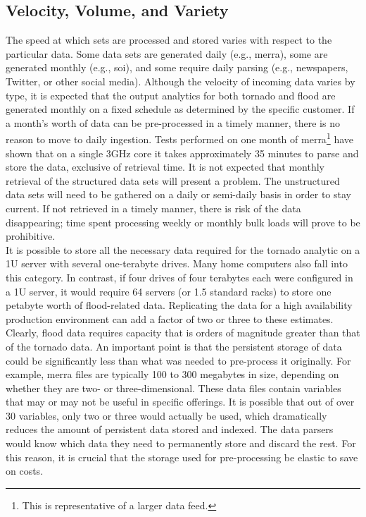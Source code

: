 \subsection{Velocity, Volume, and Variety}
The speed at which sets are processed and stored varies with respect to the particular data. Some data sets are generated daily (e.g., \gls{merra}), some are generated monthly (e.g., \gls{soi}), and some require daily parsing (e.g., newspapers, Twitter, or other social media). Although the velocity of incoming data varies by type, it is expected that the output analytics for both tornado and flood are generated monthly on a fixed schedule as determined by the specific customer. If a month's worth of data can be pre-processed in a timely manner, there is no reason to move to daily ingestion. Tests performed on one month of \gls{merra}\footnote{This is representative of a larger data feed.} have shown that on a single 3GHz core it takes approximately 35 minutes to parse and store the data, exclusive of retrieval time. It is not expected that monthly retrieval of the structured data sets will present a problem. The unstructured data sets will need to be gathered on a daily or semi-daily basis in order to stay current. If not retrieved in a timely manner, there is risk of the data disappearing; time spent processing weekly or monthly bulk loads will prove to be prohibitive.\\

It is possible to store all the necessary data required for the tornado analytic on a 1U server with several one-terabyte drives. Many home computers also fall into this category. In contrast, if four drives of four terabytes each were configured in a 1U server, it would require 64 servers  (or 1.5 standard racks) to store one petabyte worth of flood-related data. Replicating the data for a high availability production environment can add a factor of two or three to these estimates. Clearly, flood data requires capacity that is orders of magnitude greater than that of the tornado data. An important point is that the persistent storage of data could be significantly less than what was needed to pre-process it originally. For example, \gls{merra} files are typically 100 to 300 megabytes in size, depending on whether they are two- or three-dimensional. These data files contain variables that may or may not be useful in specific offerings. It is possible that out of over 30 variables, only two or three would actually be used, which dramatically reduces the amount of persistent data stored and indexed. The data parsers would know which data they need to permanently store and discard the rest. For this reason, it is crucial that the storage used for pre-processing be elastic to save on costs.\\

